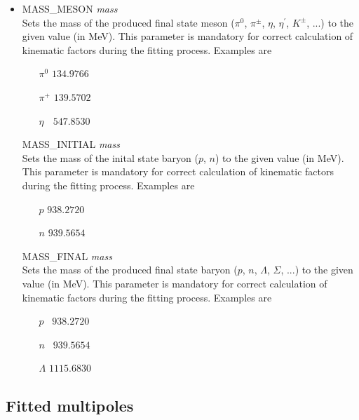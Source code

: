 \documentclass[a4paper,10pt]{article}
\def\tt{\ttfamily}
\def\rm{\rmfamily}
\begin{document}
\begin{itemize}
\item
\tt MASS\_MESON \textit{mass}\rm\\
Sets the mass of the produced final state meson ($\pi^0$, $\pi^\pm$, $\eta$, $\eta^\prime$, $K^\pm$, ...) to the given value
 (in MeV). This parameter is mandatory for correct calculation of kinematic factors during the fitting process.
Examples are
\vspace{-0.5em}\begin{itemize}
 \item[$\pi^0$\:]          $134.9766$
 \item[$\pi^+$]            $139.5702$
 \item[$\eta\phantom{^+}$] $547.8530$
\end{itemize}

\tt MASS\_INITIAL \textit{mass}\rm\\
Sets the mass of the inital state baryon ($p$, $n$) to the given value
 (in MeV). This parameter is mandatory for correct calculation of kinematic factors during the fitting process.
Examples are
\vspace{-0.5em}\begin{itemize}
 \item[$p$\:\:] $938.2720$
 \item[$n$\:\:] $939.5654$
\end{itemize}

\tt MASS\_FINAL \textit{mass}\rm\\
Sets the mass of the produced final state baryon ($p$, $n$, $\Lambda$, $\Sigma$, ...) to the given value
 (in MeV). This parameter is mandatory for correct calculation of kinematic factors during the fitting process.
Examples are
\vspace{-0.5em}\begin{itemize}
 \item[$p$\:\:] $\phantom{1}938.2720$
 \item[$n$\:\:] $\phantom{1}939.5654$
 \item[$\Lambda$\:\:]     $1115.6830$
\end{itemize}
\end{itemize}

\subsection{Fitted multipoles}
\end{document}
